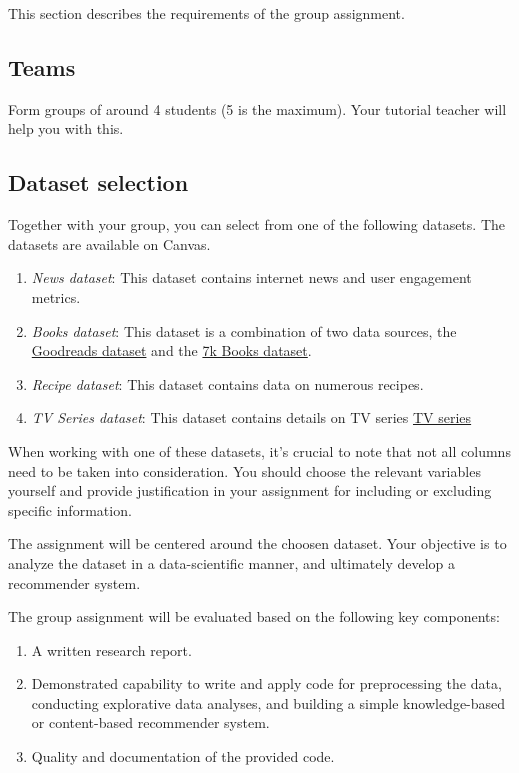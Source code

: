 This section describes the requirements of the group assignment. 

\subsection*{Teams}

Form groups of around 4 students (5 is the maximum). Your tutorial teacher will help you with this.

\subsection*{Dataset selection}
Together with your group, you can select from one of the following datasets. The datasets are available on Canvas. 

\begin{enumerate}
	\item \emph{News dataset}: This dataset contains internet news and user engagement metrics. 
 	\item \emph{Books dataset}: This dataset is a combination of two data sources, the \href{https://www.kaggle.com/datasets/jealousleopard/goodreadsbooks?resource=download}{Goodreads dataset} and the \href{https://www.kaggle.com/datasets/dylanjcastillo/7k-books-with-metadata}{7k Books dataset}.
	\item \emph{Recipe dataset}: This dataset contains data on numerous recipes. 
	\item \emph{TV Series dataset}: This dataset contains details on TV series \href{https://www.kaggle.com/datasets/bourdier/all-tv-series-details-dataset}{TV series}
\end{enumerate}

When working with one of these datasets, it's crucial to note that not all columns need to be taken into consideration. You should choose the relevant variables yourself and provide justification in your assignment for including or excluding specific information.

The assignment will be centered around the choosen dataset. Your objective is to analyze the dataset in a data-scientific manner, and ultimately develop a recommender system.

The group assignment will be evaluated based on the following key components:

\begin{enumerate}
\item A written research report.
\item Demonstrated capability to write and apply code for preprocessing the data, conducting explorative data analyses, and building a simple knowledge-based or content-based recommender system.
\item Quality and documentation of the provided code.
\end{enumerate}

